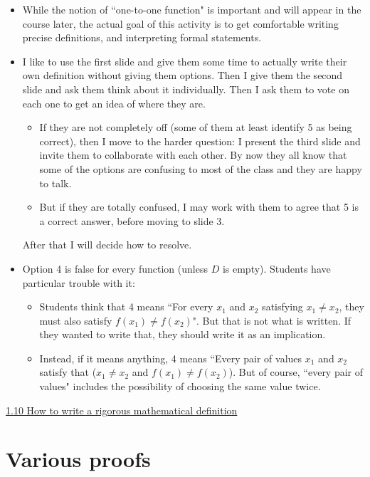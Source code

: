 \documentclass[11pt]{article}
\newcommand{\n}{\newpage}
\newcommand{\nl}{\hfill \vspace{-1.1\baselineskip}} %
\newcommand{\vten}{\hspace{8mm}\href{https://www.youtube.com/watch?v=IBwDUEXM0xs&list=PLlwePzQY_wW-CPzhk-af-MXj9knthD1gx&index=10}{1.10 How to write a rigorous mathematical definition}}
\begin{document}
\begin{comments}
\nl
\begin{itemize}
	\item  While the notion of ``one-to-one function" is important and will appear in the course later, the actual goal of this activity is to get comfortable writing  precise definitions, and interpreting formal statements.
	\item I like to use the first slide and give them some time to actually write their own definition without giving them options.   Then I give them the second slide and ask them think about it individually.  Then I ask them to vote on each one to get an idea of where they are.  
		\begin{itemize}
			\item If they are not completely off (some of them at least identify 5 as being correct), then I move to the harder question: I present the third slide and invite them to collaborate with each other.  By now they all know that some of the options are confusing to most of the class and they are happy to talk. 
			\item  But if they are totally confused, I may work with them to agree that 5 is a correct answer, before moving to slide 3. 
		\end{itemize}
		 After that I will decide how to resolve.
	\item Option 4 is false for every function (unless $D$ is empty).  Students have particular trouble with it:
		\begin{itemize}
			\item Students think that 4 means ``For every $x_1$ and $x_2$ satisfying $x_1 \neq x_2$, they must also satisfy $f(x_1) \neq f(x_2)$".  But that is not what is written.  If they wanted to write that, they should write it as an implication.
			\item  Instead, if it means anything, 4  means ``Every pair of values $x_1$ and $x_2$ satisfy that ($x_1 \neq x_2$ and $f(x_1) \neq f(x_2)$). But of course, ``every pair of values" includes the possibility of choosing the same value twice.
		\end{itemize}
\end{itemize}
\end{comments}

\begin{videos}
\vten
\end{videos}

\n
\newpage
\section{Various proofs} 
\end{document}
